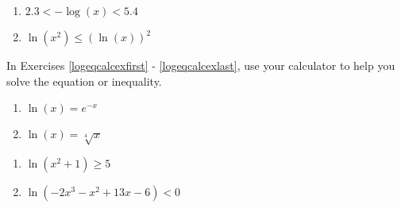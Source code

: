 \begin{multicols}{2}
\begin{enumerate}
\setcounter{enumi}{\value{HW}}


\item $2.3 < -\log(x) < 5.4$ \label{sixfourpHineq} 

\item $\ln(x^{2}) \leq (\ln(x))^{2}$ \label{solvelogineqexlast} 

\setcounter{HW}{\value{enumi}}
\end{enumerate}
\end{multicols}

In Exercises \ref{logeqcalcexfirst} - \ref{logeqcalcexlast}, use your calculator to help you solve the equation or  inequality.

\begin{multicols}{2}
\begin{enumerate}
\setcounter{enumi}{\value{HW}}

\item $\ln(x) = e^{-x}$ \label{logeqcalcexfirst} 
\item $\ln(x) = \sqrt[4]{x}$ 

\setcounter{HW}{\value{enumi}}
\end{enumerate}
\end{multicols}

\begin{multicols}{2}
\begin{enumerate}
\setcounter{enumi}{\value{HW}}

\item $\ln(x^{2} + 1) \geq 5$
\item $\ln(-2x^{3} - x^{2} + 13x - 6) < 0$ \label{logeqcalcexlast} 

\setcounter{HW}{\value{enumi}}
\end{enumerate}
\end{multicols}

